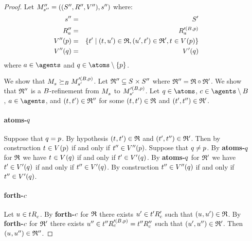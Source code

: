 \begin{proof}
Let $\kPModelAndTuplePP{\kStateSPP}$ where:
\begin{eqnarray*}
    \kStateSPP &=& \kStatesP\\
    \kAccessibilityPPA &=& \kAccessibilityA[\prime(\agentsB, \atomP)]\\
    \kValuationPP(\atomP) &=& \{\kStateTP \mid (\kStateT, \kStateUP) \in \bisimulation, (\kStateUP, \kStateTP) \in \refinement', \kStateT \in \kValuation(\atomP)\}\\
    \kValuationPP(\atomQ) &=& \kValuationP(\atomQ)
\end{eqnarray*}
where $\agentA \in \agents$ and $\atomQ \in \atoms \setminus \{\atomP\}$.

We show that $\kPModel{\kStateS} \simulatesBs \kPModel[\prime(\agentsB, \atomP)]{\kStateSP}$.
Let $\refinement'' \subseteq \kStates \times \kStatesPP$ where $\refinement'' = \bisimulation \circ \refinement'$.
We show that $\refinement''$ is a $\agentsB$-refinement from $\kPModel{\kStateS}$ to $\kPModel[\prime(\agentsB, \atomP)]{\kStateSP}$.
Let $\atomQ \in \atoms$, $\agentC \in \agents \setminus \agentsB$, $\agentA \in \agents$, and $(\kStateT, \kStateTP) \in \refinement''$ for some $(\kStateT, \kStateTP) \in \bisimulation$ and $(\kStateTP, \kStateTPP) \in \refinement'$.

\paragraph{atoms-$\atomQ$}
Suppose that $\atomQ = \atomP$.
By hypothesis $(\kStateT, \kStateTP) \in \bisimulation$ and $(\kStateTP, \kStateTPP) \in \refinement'$.
Then by construction $\kStateT \in \kValuation(\atomP)$ if and only if $\kStateTPP \in \kValuationPP(\atomP)$.
Suppose that $\atomQ \neq \atomP$.
By {\bf atoms-$\atomQ$} for $\bisimulation$ we have $\kStateT \in \kValuation(\atomQ)$ if and only if $\kStateTP \in \kValuationP(\atomQ)$.
By {\bf atoms-$\atomQ$} for $\refinement'$ we have $\kStateTP \in \kValuationP(\atomQ)$ if and only if $\kStateTPP \in \kValuationP(\atomQ)$.
By construction $\kStateTPP \in \kValuationPP(\atomQ)$ if and only if $\kStateTPP \in \kValuationP(\atomQ)$.

\paragraph{forth-$\agentC$}
Let $\kStateU \in \kSuccessorsC{\kStateT}$.
By {\bf forth-$\agentC$} for $\bisimulation$ there exists $\kStateUP \in \kSuccessorsPC{\kStateTP}$ such that $(\kStateU, \kStateUP) \in \bisimulation$.
By {\bf forth-$\agentC$} for $\refinement'$ there exists $\kStateUPP \in \kSuccessorsC[\prime(\agentsB, \atomP)]{\kStateTPP} = \kSuccessorsPPC{\kStateTPP}$ such that $(\kStateUP, \kStateUPP) \in \refinement'$.
Then $(\kStateU, \kStateUPP) \in \refinement''$.


\end{proof}
